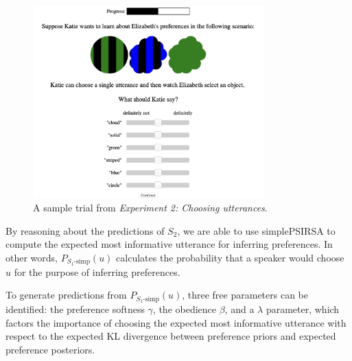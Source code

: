 \documentclass[10pt,a4paper]{article}
\newcommand{\gcs}[1]{\textcolor{blue}{[gcs: #1]}}
\begin{document}
\begin{figure}[ht]
	\centering
	\includegraphics[width=3.5in]{images/utterance-choice-trial.png}
	\caption{A sample trial from \emph{Experiment 2: Choosing utterances}. }\label{exp2-trial}
\end{figure} 

By reasoning about the predictions of $S_2$, we are able to use simplePSIRSA to compute the expected most informative utterance for inferring preferences.
In other words, $P_{S_1\textrm{-simp}}(u)$ calculates the probability that a speaker would choose $u$ for the purpose of inferring preferences.

To generate predictions from $P_{S_1\textrm{-simp}}(u)$, three free parameters can be identified:
the preference softness $\gamma$, the obedience $\beta$, and a $\lambda$ parameter, which factors the importance of choosing the expected most informative utterance with respect to the expected KL divergence between preference priors and expected preference posteriors.


\end{document}
